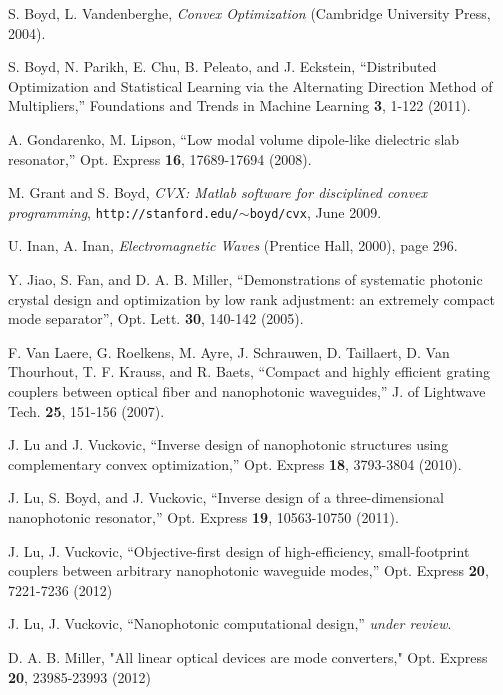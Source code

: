 \begin{thebibliography}{99}

 S. Boyd, L. Vandenberghe, \emph{Convex Optimization} (Cambridge University Press, 2004).

 S. Boyd, N. Parikh, E. Chu, B. Peleato, and J. Eckstein,
    ``Distributed Optimization and Statistical Learning via the Alternating Direction Method of Multipliers,''
    Foundations and Trends in Machine Learning \textbf{3}, 1-122 (2011). 

 A. Gondarenko, M. Lipson, ``Low modal volume dipole-like dielectric slab resonator,'' Opt. Express \textbf{16}, 17689-17694 (2008).

 M. Grant and S. Boyd, \emph{CVX: Matlab software for disciplined convex programming}, \texttt{http://stanford.edu/$\sim$boyd/cvx}, June 2009.

 U. Inan, A. Inan, \emph{Electromagnetic Waves} (Prentice Hall, 2000), page 296.

 Y. Jiao, S. Fan, and D. A. B. Miller, 
    ``Demonstrations of systematic photonic crystal design and optimization by low rank adjustment: an extremely compact mode separator'', Opt. Lett. \textbf{30}, 140-142 (2005).

F. Van Laere, G. Roelkens, M. Ayre, J. Schrauwen, D. Taillaert, D. Van Thourhout, T. F. Krauss, and R. Baets,
    ``Compact and highly efficient grating couplers between optical fiber and nanophotonic waveguides,''
    J. of Lightwave Tech. \textbf{25}, 151-156 (2007).

 J. Lu and J. Vuckovic, ``Inverse design of nanophotonic structures using complementary convex optimization,'' Opt. Express \textbf{18}, 3793-3804 (2010).

 J. Lu, S. Boyd, and J. Vuckovic, 
    ``Inverse design of a three-dimensional nanophotonic resonator,''
    Opt. Express \textbf{19}, 10563-10750 (2011). 

 J. Lu, J. Vuckovic, ``Objective-first design of high-efficiency, small-footprint couplers between arbitrary nanophotonic waveguide modes,'' 
    Opt. Express \textbf{20}, 7221-7236 (2012)

 J. Lu, J. Vuckovic, ``Nanophotonic computational design,'' \emph{under review}.

 D. A. B. Miller, "All linear optical devices are mode converters," Opt. Express \textbf{20}, 23985-23993 (2012)


\end{thebibliography}
